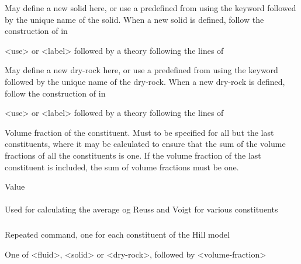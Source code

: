 {
 \slist
   \item \Description May define a new solid here, or use a predefined  from  using the keyword  followed by the unique name of the solid. When a new solid is defined, follow the construction of  in 
   \item \Argument <use> or <label> followed by a theory following the lines of 
   \item \Default
 \elist

 \slist
   \item \Description  May define a new dry-rock here, or use a predefined  from  using the keyword  followed by the unique name of the dry-rock. When a new dry-rock is defined, follow the construction of  in 
   \item \Argument <use> or <label> followed by a theory following the lines of 
   \item \Default
 \elist

 \slist
   \item \Description Volume fraction of the constituent. Must to be specified for all but the last constituents, where it may be calculated to ensure that the sum of the volume fractions of all the constituents is one. If the volume fraction of the last constituent is included, the sum of volume fractions must be one. 
   \item \Argument Value
   \item \Default
 \elist

\paragraph{}
 \slist
   \item \Description Used for calculating the average og Reuss and Voigt for various constituents
   \item \Argument
   \item \Default 
 \elist

\subparagraph{}
 \slist
   \item \Description Repeated command, one for each constituent of the Hill model
   \item \Argument One of <fluid>, <solid> or <dry-rock>, followed by <volume-fraction>
   \item \Default
 \elist

}
